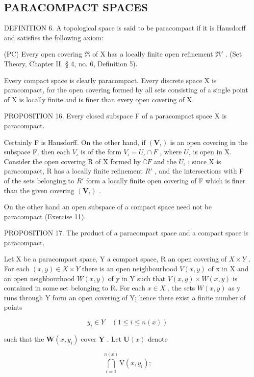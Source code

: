 \subsection{PARACOMPACT SPACES}

DEFINITION 6. A topological space is said to be paracompact if it is Hausdorff and satisfies the following axiom:

(PC) Every open covering \(\Re\) of X has a locally finite open refinement \(\Re'\) . (Set Theory, Chapter II, § 4, no. 6, Definition 5).

Every compact space is clearly paracompact. Every discrete space X is paracompact, for the open covering formed by all sets consisting of a single point of X is locally finite and is finer than every open covering of X.

PROPOSITION 16. Every closed subspace F of a paracompact space X is paracompact.

Certainly F is Hausdorff. On the other hand, if \((\mathbf{V}_{\iota})\) is an open covering in the subspace F, then each \(V_{\iota}\) is of the form \(V_{\iota} = U_{\iota} \cap F\) , where \(U_{\iota}\) is open in X. Consider the open covering R of X formed by \(\complement F\) and the \(U_{\iota}\) ; since X is paracompact, R has a locally finite refinement \(R'\) , and the intersections with F of the sets belonging to \(R'\) form a locally finite open covering of F which is finer than the given covering \((\mathbf{V}_{\iota})\) .

On the other hand an open subspace of a compact space need not be paracompact (Exercise 11).

PROPOSITION 17. The product of a paracompact space and a compact space is paracompact.

Let X be a paracompact space, Y a compact space, R an open covering of \(X \times Y\) . For each \((x, y) \in X \times Y\) there is an open neighbourhood \(V(x, y)\) of x in X and an open neighbourhood \(W(x, y)\) of y in Y such that \(V(x, y) \times W(x, y)\) is contained in some set belonging to R. For each \(x \in X\) , the sets \(W(x, y)\) as y runs through Y form an open covering of Y; hence there exist a finite number of points

\[
y _ {i} \in Y \quad (1 \leqslant i \leqslant n (x))
\]

such that the \(\mathbf{W}(x, y_i)\) cover \(\mathbf{Y}\) . Let \(\mathbf{U}(x)\) denote

\[
\bigcap_ {i = 1} ^ {n (x)} \mathrm{V} (x, y _ {i});
\]

